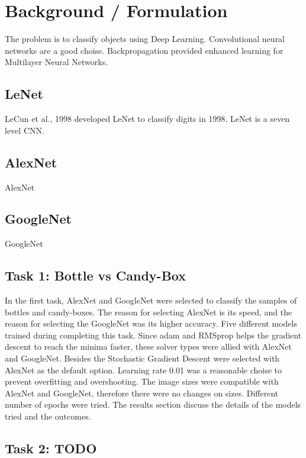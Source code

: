 \documentclass[10pt,journal,compsoc]{IEEEtran}
\begin{document}
   

\section{Background / Formulation}
The problem is to classify objects using Deep Learning. Convolutional neural networks are a good choise\cite{wiki:cnn}. Backpropagation provided enhanced learning for Multilayer Neural Networks.

\subsection{LeNet}
LeCun et al., 1998 developed LeNet to classify digits in 1998\cite{lenet}. LeNet is a seven level CNN.

\subsection{AlexNet}
AlexNet\cite{AlexNet}

\subsection{GoogleNet}
GoogleNet\cite{gnet}

\subsection{Task 1: Bottle vs Candy-Box}
In the first task, AlexNet and GoogleNet were selected to classify the samples of bottles and candy-boxes. The reason for selecting AlexNet is its speed, and the reason for selecting the GoogleNet was its higher accuracy. Five different models trained during completing this task. Since adam and RMSprop helps the gradient descent to reach the minima faster, these solver types were allied with AlexNet and GoogleNet. Besides the Stochastic Gradient Descent were selected with AlexNet as the default option. Learning rate 0.01 was a reasonable choise to prevent overfitting and overshooting. The image sizes were compatible with AlexNet and GoogleNet, therefore there were no changes on sizes. Different number of epochs were tried. The results section discuss the details of the models tried and the outcomes.



\subsection{Task 2: TODO}
\end{document}
